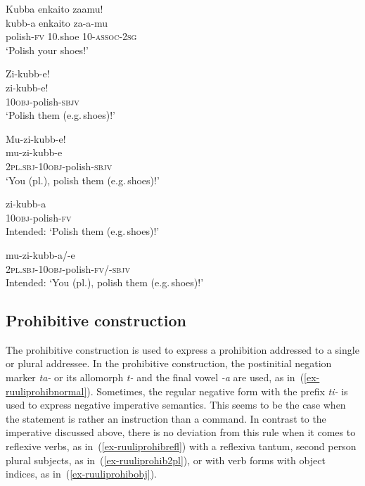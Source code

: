 \ea \label{ex-ruuliimpobj}
\begin{xlist}
\ex 	\label{ex-ruuliimpobj1}
	\glll Kubba enkaito zaamu!\\	
	    kubb-a enkaito za-a-mu\\
		polish-\textsc{fv} 10.shoe 10-\textsc{assoc}-2\textsc{sg}\\
	\glt ‘Polish your shoes!’ 
	
\ex	\label{ex-ruuliimpobj2}
	\glll   Zi-kubb-e!\\ 
	        zi-kubb-e!\\
		\textsc{10obj}-polish-\textsc{sbjv}\\
	\glt ‘Polish them (e.g.\,shoes)!’
	
\ex 	\label{ex-ruuliimpobj3}
	\glll   Mu-zi-kubb-e!\\
	        mu-zi-kubb-e\\
		2\textsc{pl.sbj}-\textsc{10obj}-polish-\textsc{sbjv}\\
	\glt ‘You (pl.), polish them (e.g.\,shoes)!’

\ex \label{ex-ruuliimpobj2wrong}
	\gll *zi-kubb-a\\
		\textsc{10obj}-polish-\textsc{fv}\\
	\glt Intended: ‘Polish them (e.g.\,shoes)!’

\ex \label{ex-ruuliimpobj3wrong}
	\gll *mu-zi-kubb-a/-e\\
		2\textsc{pl.sbj}-\textsc{10obj}-polish-\textsc{fv}/-\textsc{sbjv}\\
	\glt Intended: ‘You (pl.), polish them (e.g.\,shoes)!’
\end{xlist}
\z

\subsection{Prohibitive construction}\label{sec-prohibitive}
The prohibitive construction is used to express a prohibition addressed to a single or plural addressee. 
In the prohibitive construction, the postinitial negation marker \emph{ta-} or its allomorph \emph{t-} and the final vowel \emph{-a} are used, as in~(\ref{ex-ruuliprohibnormal}). 
Sometimes, the regular negative form with the prefix \emph{ti-} is used to express negative imperative semantics. 
This seems to be the case when the statement  is rather an instruction than a command. 
In contrast to the imperative discussed above, there is no deviation from this rule when it comes to reflexive verbs, as in~(\ref{ex-ruuliprohibrefl}) with a reflexiva tantum, second person plural subjects, as in~(\ref{ex-ruuliprohib2pl}), or with verb forms with object indices, as in~(\ref{ex-ruuliprohibobj}). 

